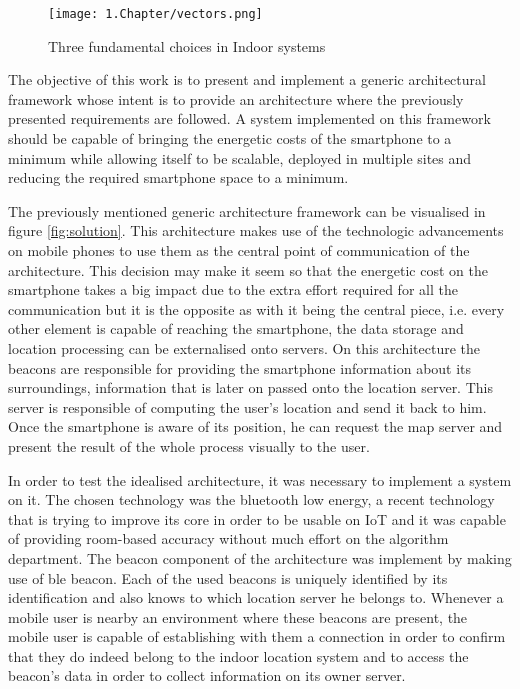 \begin{figure}[htp]
	\centering
		\texttt{[image: 1.Chapter/vectors.png]}
	\caption[Three fundamental choices in Indoor systems]{Three fundamental choices in Indoor systems}
	\label{fig:choices}
\end{figure}

The objective of this work is to present and implement a generic architectural framework whose intent is to provide an architecture where the previously presented requirements are followed. A system implemented on this framework should be capable of bringing the energetic costs of the smartphone to a minimum while allowing itself to be scalable, deployed in multiple sites and reducing the required smartphone space to a minimum.

The previously mentioned generic architecture framework can be visualised in figure \ref{fig:solution}. This architecture makes use of the technologic advancements on mobile phones to use them as the central point of communication of the architecture. This decision may make it seem so that the energetic cost on the smartphone takes a big impact due to the extra effort required for all the communication but it is the opposite as with it being the central piece, i.e. every other element is capable of reaching the smartphone, the data storage and location processing can be externalised onto servers. On this architecture the beacons are responsible for providing the smartphone information about its surroundings, information that is later on passed onto the location server. This server is responsible of computing the user's location and send it back to him. Once the smartphone is aware of its position, he can request the map server and present the result of the whole process visually to the user.

In order to test the idealised architecture, it was necessary to implement a system on it. The chosen technology was the bluetooth low energy, a recent technology that is trying to improve its core in order to be usable on \ac{IoT} and it was capable of providing room-based accuracy without much effort on the algorithm department. The beacon component of the architecture was implement by making use of ble beacon. Each of the used beacons is uniquely identified by its identification and also knows to which location server he belongs to. Whenever a mobile user is nearby an environment where these beacons are present, the mobile user is capable of establishing with them a connection in order to confirm that they do indeed belong to the indoor location system and to access the beacon's data in order to collect information on its owner server.

